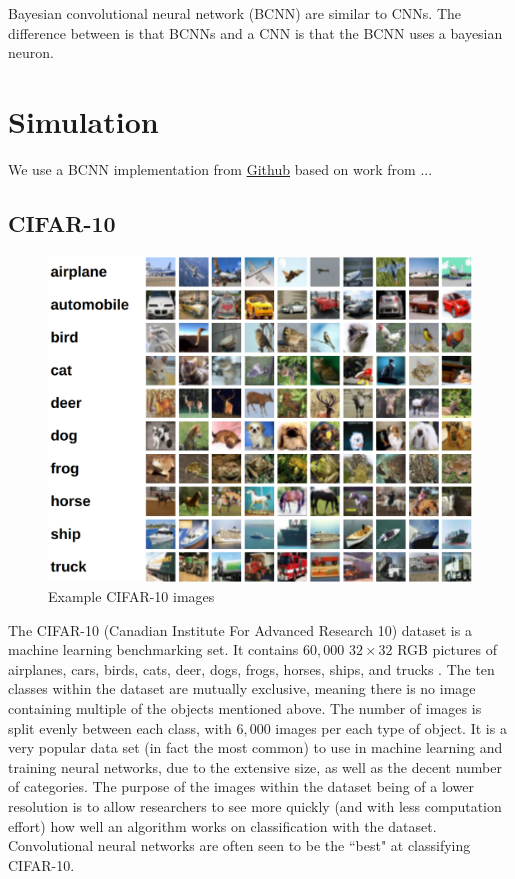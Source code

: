 \documentclass[12pt]{article}
\begin{document}
Bayesian convolutional neural network (BCNN) are similar to CNNs. The difference between is that BCNNs and a CNN is that the BCNN uses a bayesian neuron.

\section{Simulation}

We use a BCNN implementation from \href{https://github.com/kumar-shridhar/PyTorch-BayesianCNN}{Github} based on work from ... \cite{shridhar2019comprehensive} \cite{shridhar2018uncertainty}

\subsection{CIFAR-10}

	\begin{figure}[H]
		\centering
	\includegraphics[width=.75\textwidth]{../Images/cifar-10.png}
	\caption{Example CIFAR-10 images \cite{cifar10}}
\end{figure}

The CIFAR-10 (Canadian Institute For Advanced Research 10) dataset is a machine learning benchmarking set. It contains $60,000$ $32 \times 32$ RGB pictures of airplanes, cars, birds, cats, deer, dogs, frogs, horses, ships, and trucks \cite{cifar10}. The ten classes within the dataset are mutually exclusive, meaning there is no image containing multiple of the objects mentioned above. The number of images is split evenly between each class, with $6,000$ images per each type of object. It is a very popular data set (in fact the most common) to use in machine learning and training neural networks, due to the extensive size, as well as the decent number of categories. The purpose of the images within the dataset being of a lower resolution is to allow researchers to see more quickly (and with less computation effort) how well an algorithm works on classification with the dataset. Convolutional neural networks are often seen to be the ``best" at classifying CIFAR-10.
\end{document}
